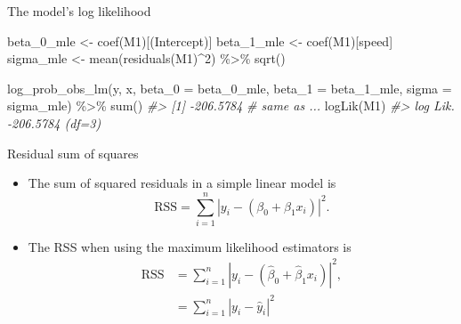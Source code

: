 \documentclass[
  10pt,
  ignorenonframetext,
]{beamer}
\newenvironment{Shaded}{\begin{snugshade}}{\end{snugshade}}
\newcommand{\AttributeTok}[1]{\textcolor[rgb]{0.77,0.63,0.00}{#1}}
\newcommand{\CommentTok}[1]{\textcolor[rgb]{0.56,0.35,0.01}{\textit{#1}}}
\newcommand{\DecValTok}[1]{\textcolor[rgb]{0.00,0.00,0.81}{#1}}
\newcommand{\FunctionTok}[1]{\textcolor[rgb]{0.00,0.00,0.00}{#1}}
\newcommand{\NormalTok}[1]{#1}
\newcommand{\OtherTok}[1]{\textcolor[rgb]{0.56,0.35,0.01}{#1}}
\newcommand{\SpecialCharTok}[1]{\textcolor[rgb]{0.00,0.00,0.00}{#1}}
\newcommand{\StringTok}[1]{\textcolor[rgb]{0.31,0.60,0.02}{#1}}
\providecommand{\tightlist}{%
  \setlength{\itemsep}{0pt}\setlength{\parskip}{0pt}}
\begin{document}
\begin{frame}[fragile]{The model's log likelihood}
\protect\hypertarget{the-models-log-likelihood-1}{}
\begin{Shaded}
\begin{Highlighting}[]
\NormalTok{beta\_0\_mle }\OtherTok{\textless{}{-}} \FunctionTok{coef}\NormalTok{(M1)[}\StringTok{\textquotesingle{}(Intercept)\textquotesingle{}}\NormalTok{]}
\NormalTok{beta\_1\_mle }\OtherTok{\textless{}{-}} \FunctionTok{coef}\NormalTok{(M1)[}\StringTok{\textquotesingle{}speed\textquotesingle{}}\NormalTok{]}
\NormalTok{sigma\_mle }\OtherTok{\textless{}{-}} \FunctionTok{mean}\NormalTok{(}\FunctionTok{residuals}\NormalTok{(M1)}\SpecialCharTok{\^{}}\DecValTok{2}\NormalTok{) }\SpecialCharTok{\%\textgreater{}\%} \FunctionTok{sqrt}\NormalTok{()}

\FunctionTok{log\_prob\_obs\_lm}\NormalTok{(y, x, }
                \AttributeTok{beta\_0 =}\NormalTok{ beta\_0\_mle,}
                \AttributeTok{beta\_1 =}\NormalTok{ beta\_1\_mle,}
                \AttributeTok{sigma =}\NormalTok{ sigma\_mle) }\SpecialCharTok{\%\textgreater{}\%} \FunctionTok{sum}\NormalTok{()}
\CommentTok{\#\textgreater{} [1] {-}206.5784}
\CommentTok{\# same as ...}
\FunctionTok{logLik}\NormalTok{(M1)}
\CommentTok{\#\textgreater{} \textquotesingle{}log Lik.\textquotesingle{} {-}206.5784 (df=3)}
\end{Highlighting}
\end{Shaded}
\end{frame}

\begin{frame}{Residual sum of squares}
\protect\hypertarget{residual-sum-of-squares}{}
\begin{itemize}
\tightlist
\item
  The sum of squared residuals in a simple linear model is \[
  \text{RSS} = \sum_{i=1}^n |y_i - (\beta_0 + \beta_1 x_i)|^2.
  \]
\item
  The RSS when using the maximum likelihood estimators is \[
  \begin{aligned}
  \text{RSS} &= \sum_{i=1}^n |y_i - (\hat{\beta}_0 + \hat{\beta}_1 x_i)|^2,\\
           &= \sum_{i=1}^n |y_i - \hat{y}_i|^2
  \end{aligned}
  \]
\end{itemize}
\end{frame}
\end{document}
